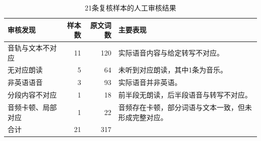 \begin{table}[H]
    \centering\small
    \caption{21条复核样本的人工审核结果}
    \label{tab:p1_manual_review}
    \setlength{\tabcolsep}{5pt}
    \renewcommand{\arraystretch}{1.2}
    \begin{tabular}{@{}lrr>{\raggedright\arraybackslash}p{5.0cm}@{}}
        \toprule
        审核发现 & 样本数 & 原文词数 & 主要表现\\ \midrule
        音轨与文本不对应 & 11 & 120 & 实际语音内容与给定转写不对应。\\
        无对应朗读 & 5 & 64 & 未听到对应朗读，其中1条为音乐。\\
        非英语语音 & 3 & 93 & 实际语音并非英语。\\
        分段内容不对应 & 1 & 18 & 前半段无朗读，后半段语音与转写不对应。\\
        音频卡顿、局部对应 & 1 & 22 & 音频存在卡顿，部分词语与文本一致，但未形成完整对应。\\
        \midrule
        合计 & 21 & 317 & \\
        \bottomrule
    \end{tabular}
\end{table}
